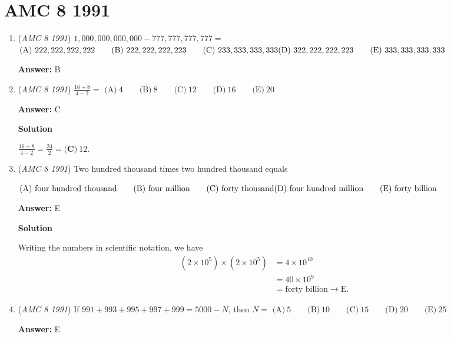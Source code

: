 \section{AMC 8 1991}
        \begin{enumerate}
        	\item (\textit{AMC 8 1991}) $1,000,000,000,000-777,777,777,777=$
$\text{(A)}\ 222,222,222,222 \qquad  \text{(B)}\ 222,222,222,223 \qquad  \text{(C)}\ 233,333,333,333 \qquad \\ \text{(D)}\ 322,222,222,223 \qquad  \text{(E)}\ 333,333,333,333$

 \textbf{Answer: }B


	\item (\textit{AMC 8 1991}) $\frac{16+8}{4-2}=$
$\text{(A)}\ 4 \qquad \text{(B)}\ 8 \qquad \text{(C)}\ 12 \qquad \text{(D)}\ 16 \qquad \text{(E)}\ 20$

 \textbf{Answer: }C



\textbf{Solution}

$\frac{16+8}{4-2} = \frac{24}{2} = \boxed{\textbf{(C)}\ 12}$.

 


	\item (\textit{AMC 8 1991}) Two hundred thousand times two hundred thousand equals


 $\text{(A)}\ \text{four hundred thousand} \qquad  \text{(B)}\ \text{four million} \qquad  \text{(C)}\ \text{forty thousand} \qquad  \\ \text{(D)}\ \text{four hundred million} \qquad  \text{(E)}\ \text{forty billion}$

 \textbf{Answer: }E



\textbf{Solution}

Writing the numbers in scientific notation, we have
 \begin{align*} (2\times 10^5)\times (2\times 10^5) &= 4\times 10^{10} \\ &= 40\times 10^9 \\ &= \text{forty billion} \rightarrow \boxed{\text{E}}. \end{align*}




	\item (\textit{AMC 8 1991}) If $991+993+995+997+999=5000-N$, then $N=$
$\text{(A)}\ 5 \qquad \text{(B)}\ 10 \qquad \text{(C)}\ 15 \qquad \text{(D)}\ 20 \qquad \text{(E)}\ 25$

 \textbf{Answer: }E




\end{enumerate}
